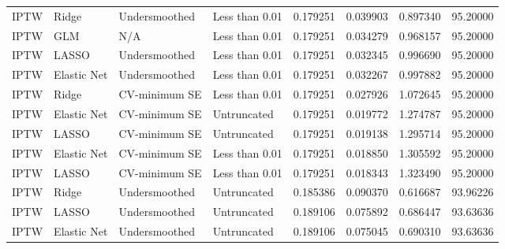 \begin{longtable}[l]{llllllll}
IPTW & Ridge & Undersmoothed & Less than 0.01 & 0.179251 & 0.039903 & 0.897340 & 95.20000\\
IPTW & GLM & N/A & Less than 0.01 & 0.179251 & 0.034279 & 0.968157 & 95.20000\\
IPTW & LASSO & Undersmoothed & Less than 0.01 & 0.179251 & 0.032345 & 0.996690 & 95.20000\\
IPTW & Elastic Net & Undersmoothed & Less than 0.01 & 0.179251 & 0.032267 & 0.997882 & 95.20000\\
IPTW & Ridge & CV-minimum SE & Less than 0.01 & 0.179251 & 0.027926 & 1.072645 & 95.20000\\
IPTW & Elastic Net & CV-minimum SE & Untruncated & 0.179251 & 0.019772 & 1.274787 & 95.20000\\
IPTW & LASSO & CV-minimum SE & Untruncated & 0.179251 & 0.019138 & 1.295714 & 95.20000\\
IPTW & Elastic Net & CV-minimum SE & Less than 0.01 & 0.179251 & 0.018850 & 1.305592 & 95.20000\\
IPTW & LASSO & CV-minimum SE & Less than 0.01 & 0.179251 & 0.018343 & 1.323490 & 95.20000\\
IPTW & Ridge & Undersmoothed & Untruncated & 0.185386 & 0.090370 & 0.616687 & 93.96226\\
IPTW & LASSO & Undersmoothed & Untruncated & 0.189106 & 0.075892 & 0.686447 & 93.63636\\
IPTW & Elastic Net & Undersmoothed & Untruncated & 0.189106 & 0.075045 & 0.690310 & 93.63636\\
\bottomrule
\end{longtable}
